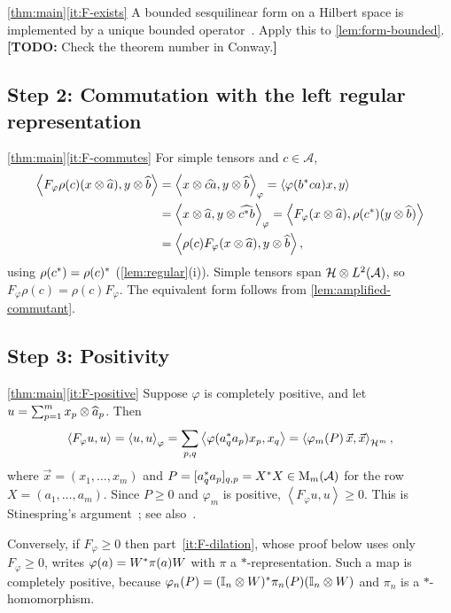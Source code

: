 \documentclass[12pt]{article}
\newcommand{\todo}[1]{\textcolor{\mysubcolor}{\small\textbf{[TODO:} #1\textbf{]}}}
\newcommand{\alg}{\mathcal{A}}             %
\newcommand{\hilb}{\mathcal{H}}            %
\newcommand{\matr}[2]{\mathrm{M}_{#1}\br{#2}} %
\newcommand{\ip}[2]{\left\langle #1 , #2 \right\rangle}
\newcommand{\ipphi}[2]{\left\langle #1 , #2 \right\rangle_{\varphi}}
\newcommand{\Ltwo}{L^2\br{\alg}}           %
\newcommand{\vect}[1]{\widehat{#1}}        %
\newcommand{\Ltn}{\hilb \tensor \Ltwo}     %
\newcommand{\Fphi}{F_{\varphi}}            %
\begin{document}
\begin{proofof}{\cref{thm:main}\ref{it:F-exists}}
A bounded sesquilinear form on a Hilbert space is implemented by a unique bounded
operator~\cite[Theorem~II.2.2]{Conway1990}. Apply this to
\cref{lem:form-bounded}.
\todo{Check the theorem number in Conway.}
\end{proofof}

\subsection{Step 2: Commutation with the left regular representation}
\label{sec:step-commute}

\begin{proofof}{\cref{thm:main}\ref{it:F-commutes}}
For simple tensors and \(c \in \alg\),
\begin{align*}
  \ip{\Fphi \rho(c)(x \tensor \vect{a})}{y \tensor \vect{b}}
  &= \ipphi{x \tensor \vect{ca}}{y \tensor \vect{b}}
   = \ip{\varphi(b^\adjoint c a) x}{y} \\
  &= \ipphi{x \tensor \vect{a}}{y \tensor \vect{c^\adjoint b}}
   = \ip{\Fphi (x \tensor \vect{a})}{\rho(c^\adjoint)(y \tensor \vect{b})} \\
  &= \ip{\rho(c)\Fphi (x \tensor \vect{a})}{y \tensor \vect{b}},
\end{align*}
using \(\rho(c^*) = \rho(c)^*\) (\cref{lem:regular}(i)). Simple
tensors span \(\Ltn\), so \(\Fphi\rho(c) = \rho(c)\Fphi\). The equivalent form
follows from \cref{lem:amplified-commutant}.
\end{proofof}

\subsection{Step 3: Positivity}
\label{sec:step-positive}

\begin{proofof}{\cref{thm:main}\ref{it:F-positive}}
Suppose \(\varphi\) is completely positive, and let
\(u = \sum_{p=1}^m x_p \tensor \vect{a}_p\). Then
\[
  \ip{\Fphi u}{u} = \ipphi{u}{u} = \sum_{p,q} \ip{\varphi(a_q^\adjoint a_p)x_p}{x_q}
  = \ip{\varphi_m(P)\,\vec{x}}{\vec{x}}_{\hilb^m},
\]
where \(\vec{x} = (x_1, \dots, x_m)\) and \(P = [a_q^\adjoint a_p]_{q,p} =
X^\adjoint X \in \matr{m}{\alg}\) for the row \(X = (a_1, \dots, a_m)\). Since
\(P \ge 0\) and \(\varphi_m\) is positive, \(\ip{\Fphi u}{u} \ge 0\). This is
Stinespring's argument~\cite{Stinespring1955}; see
also~\cite[Theorem~4.1]{Paulsen2002}.

Conversely, if \(\Fphi \ge 0\) then part~\ref{it:F-dilation}, whose proof below
uses only \(\Fphi \ge 0\), writes \(\varphi(a) = W^* \pi(a) W\) with \(\pi\)
a \(*\)-representation. Such a map is completely positive, because
\(\varphi_n(P) = ({\mathbb I}_n \otimes W)^* \pi_n(P) ({\mathbb I}_n \otimes W)\) and
\(\pi_n\) is a \(*\)-homomorphism.
\end{proofof}
\end{document}
